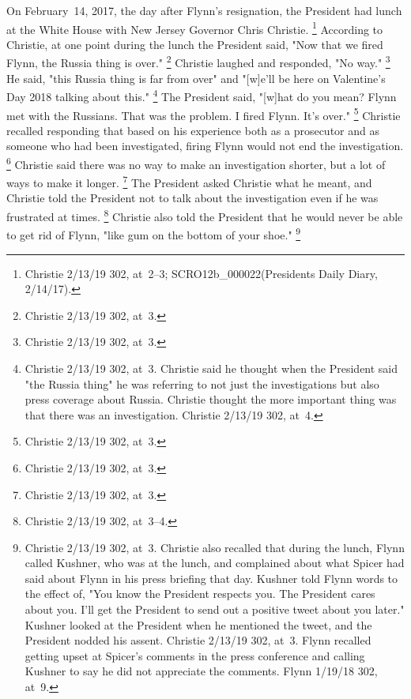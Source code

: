 On February~14, 2017, the day after Flynn's resignation, the President had lunch at the White House with New Jersey Governor Chris Christie.%
\footnote{Christie 2/13/19 302, at~2--3;
SCRO12b\_000022(Presidents Daily Diary, 2/14/17).}
According to Christie, at one point during the lunch the President said, "Now that we fired Flynn, the Russia thing is over."%
\footnote{Christie 2/13/19 302, at~3.}
Christie laughed and responded, "No way."%
\footnote{Christie 2/13/19 302, at~3.}
He said, "this Russia thing is far from over" and "[w]e'll be here on Valentine's Day 2018 talking about this."%
\footnote{Christie 2/13/19 302, at~3.
Christie said he thought when the President said "the Russia thing" he was referring to not just the investigations but also press coverage about Russia.
Christie thought the more important thing was that there was an investigation.
Christie 2/13/19 302, at~4.}
The President said, "[w]hat do you mean?
Flynn met with the Russians.
That was the problem.
I fired Flynn.
It's over."%
\footnote{Christie 2/13/19 302, at~3.}
Christie recalled responding that based on his experience both as a prosecutor and as someone who had been investigated, firing Flynn would not end the investigation.%
\footnote{Christie 2/13/19 302, at~3.}
Christie said there was no way to make an investigation shorter, but a lot of ways to make it longer.%
\footnote{Christie 2/13/19 302, at~3.}
The President asked Christie what he meant, and Christie told the President not to talk about the investigation even if he was frustrated at times.%
\footnote{Christie 2/13/19 302, at~3--4.}
Christie also told the President that he would never be able to get rid of Flynn, "like gum on the bottom of your shoe."%
\footnote{Christie 2/13/19 302, at~3.
Christie also recalled that during the lunch, Flynn called Kushner, who was at the lunch, and complained about what Spicer had said about Flynn in his press briefing that day.
Kushner told Flynn words to the effect of, "You know the President respects you.
The President cares about you.
I'll get the President to send out a positive tweet about you later."
Kushner looked at the President when he mentioned the tweet, and the President nodded his assent.
Christie 2/13/19 302, at~3.
Flynn recalled getting upset at Spicer's comments in the press conference and calling Kushner to say he did not appreciate the comments.
Flynn 1/19/18 302, at~9.}

